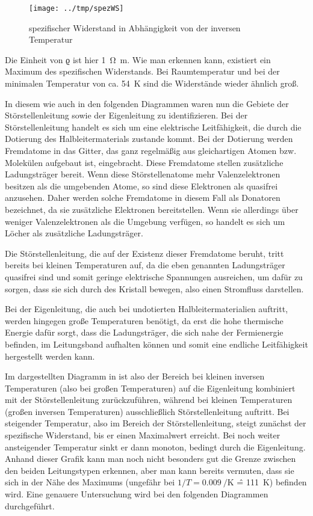 \begin{figure}[htb]
   \centering
   \texttt{[image: ../tmp/spezWS]}
   \caption{spezifischer Widerstand in Abhängigkeit von der inversen Temperatur}
   \label{fig:spezWS}
\end{figure}

Die Einheit von ϱ ist hier \SI{1}{\ohm\meter}.
Wie man erkennen kann, existiert ein Maximum des spezifischen Widerstands. Bei
Raumtemperatur und bei der minimalen Temperatur von ca. \SI{54}{\kelvin} sind
die Widerstände wieder ähnlich groß.

In diesem wie auch in den folgenden Diagrammen waren nun die Gebiete der
Störstellenleitung sowie der Eigenleitung zu identifizieren. Bei der
Störstellenleitung handelt es sich um eine elektrische Leitfähigkeit, die durch
die Dotierung des Halbleitermaterials zustande kommt. Bei der Dotierung werden
Fremdatome in das Gitter, das ganz regelmäßig aus gleichartigen Atomen bzw.
Molekülen aufgebaut ist, eingebracht. Diese Fremdatome stellen zusätzliche
Ladungsträger bereit. Wenn diese Störstellenatome mehr Valenzelektronen besitzen
als die umgebenden Atome, so sind diese Elektronen als quasifrei anzusehen.
Daher werden solche Fremdatome in diesem Fall als Donatoren bezeichnet, da sie
zusätzliche Elektronen bereitstellen. Wenn sie allerdings über weniger
Valenzelektronen als die Umgebung verfügen, so handelt es sich um Löcher als
zusätzliche Ladungsträger.

Die Störstellenleitung, die auf der Existenz dieser Fremdatome beruht, tritt
bereits bei kleinen Temperaturen auf, da die eben genannten Ladungsträger
quasifrei sind und somit geringe elektrische Spannungen ausreichen, um dafür zu
sorgen, dass sie sich durch des Kristall bewegen, also einen Stromfluss
darstellen.

Bei der Eigenleitung, die auch bei undotierten Halbleitermaterialien auftritt,
werden hingegen große Temperaturen benötigt, da erst die hohe thermische Energie
dafür sorgt, dass die Ladungsträger, die sich nahe der Fermienergie befinden, im
Leitungsband aufhalten können und somit eine endliche Leitfähigkeit hergestellt
werden kann. 

Im dargestellten Diagramm in  ist also der Bereich bei kleinen
inversen Temperaturen (also bei großen Temperaturen) auf die Eigenleitung
kombiniert mit der Störstellenleitung zurückzuführen, während bei kleinen
Temperaturen (großen inversen Temperaturen) ausschließlich Störstellenleitung
auftritt. Bei steigender Temperatur, also im Bereich der Störstellenleitung,
steigt zunächst der spezifische Widerstand, bis er einen Maximalwert erreicht.
Bei noch weiter ansteigender Temperatur sinkt er dann monoton, bedingt durch die
Eigenleitung. Anhand dieser Grafik kann man noch nicht besonders gut die Grenze
zwischen den beiden Leitungstypen erkennen, aber man kann bereits vermuten,
dass sie sich in der Nähe des Maximums (ungefähr bei $1/T =
\SI{0,009}{\per\kelvin}$ \^{=} \SI{111}{\kelvin}) befinden wird. Eine genauere
Untersuchung wird bei den folgenden Diagrammen durchgeführt.

